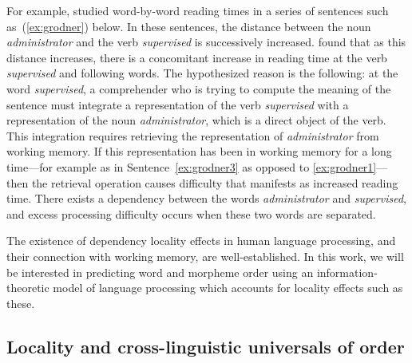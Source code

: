 For example, \citet{grodner-consequences-2005} studied word-by-word reading times in a series of sentences such as~(\ref{ex:grodner}) below. 
In these sentences, the distance between the noun \emph{administrator} and the verb \emph{supervised} is successively increased. \citet{grodner-consequences-2005} found that as this distance increases, there is a concomitant increase in reading time at the verb \emph{supervised} and following words. The hypothesized reason is the following: at the word \emph{supervised}, a comprehender who is trying to compute the meaning of the sentence must integrate a representation of the verb \emph{supervised} with a representation of the noun \emph{administrator}, which is a direct object of the verb. This integration requires retrieving the representation of \emph{administrator} from working memory. If this representation has been in working memory for a long time---for example as in Sentence~\ref{ex:grodner3} as opposed to \ref{ex:grodner1}---then the retrieval operation causes difficulty that manifests as increased reading time. There exists a dependency between the words \emph{administrator} and \emph{supervised}, and excess processing difficulty occurs when these two words are separated. 

The existence of dependency locality effects in human language processing, and their connection with working memory, are well-established. In this work, we will be interested in predicting word and morpheme order using an information-theoretic model of language processing which accounts for locality effects such as these. 

\subsection{Locality and cross-linguistic universals of order}

